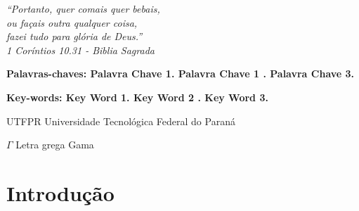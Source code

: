 \documentclass{utfpr-pg}
\let\oldlstlistoflistings\lstlistoflistings
\renewcommand{\lstlistoflistings}{%
  \begingroup%
  \let\oldnumberline\numberline%
  \renewcommand{\numberline}{\lstlistingname~\oldnumberline}%
  \oldlstlistoflistings*%
  \endgroup}
\renewcommand{\lstlistingname}{Código}
\begin{document}
\begin{epigrafe}
    \vspace*{\fill}
	\begin{flushright}
		\textit{``Portanto, quer comais quer bebais, \\
    ou façais outra qualquer coisa, \\
    fazei tudo para glória de Deus.'' \\
    1 Coríntios 10.31 - Biblia Sagrada}
	\end{flushright}
\end{epigrafe}

 \begin{resumo}
   \blindtext
   \vspace{\onelineskip}

   \noindent
   \textbf{Palavras-chaves: Palavra Chave 1. Palavra Chave 1 . Palavra Chave 3.}
 \end{resumo}

 \begin{resumo}[Abstract]
   \blindtext
   \vspace{\onelineskip}

   \noindent
   \textbf{Key-words: Key Word 1. Key Word 2 . Key Word 3.}
 \end{resumo}


\listoffigures*
\cleardoublepage

\listoftables*
\cleardoublepage


\lstlistoflistings



\begin{siglas}
    \item[UTFPR] Universidade Tecnológica Federal do Paraná
\end{siglas}

 \begin{simbolos}
    \item[$ \Gamma $] Letra grega Gama
 \end{simbolos}

\tableofcontents*
\cleardoublepage

\textual
  \pagestyle{simple}

\chapter{Introdução}
  \label{chapter:introducao}
  \blindtext[3]
\end{document}
